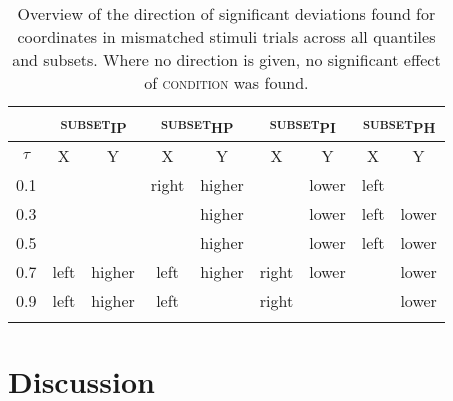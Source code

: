 \begin{table}\fontsize{10}{11}
\caption{Overview of the direction of significant deviations found for coordinates in mismatched stimuli trials across all quantiles and subsets. Where no direction is given, no significant effect of \textsc{condition} was found.}
\label{tab:8.10}
\centering
\begin{tabular}{ccccccccc}
\lsptoprule
\multirow{2}{*}{~} & 
\multicolumn{2}{c}{\textsc{subset\textsubscript{IP}}} & 
\multicolumn{2}{c}{\textsc{subset\textsubscript{HP}}} & 
\multicolumn{2}{c}{\textsc{subset\textsubscript{PI}}} & 
\multicolumn{2}{c}{\textsc{subset\textsubscript{PH}}}  \\
\midrule
                                   $\tau$    & X    & Y                     & X     & Y                    & X     & Y                    & X    & Y                      \\
                                       \midrule
0.1                                    & ~    & ~                     & right & higher               & ~     & lower                & left & ~                      \\
0.3                                    & ~    & ~                     & ~     & higher               & ~     & lower                & left & lower                  \\
0.5                                    & ~    & ~                     & ~     & higher               & ~     & lower                & left & lower                  \\
0.7                                    & left & higher                & left  & higher               & right & lower                & ~    & lower                  \\
0.9                                    & left & higher                & left  & ~                    & right & ~                    & ~    & lower     \\
\lspbottomrule
\end{tabular}
\end{table}

\section{Discussion}\label{section08_3}

